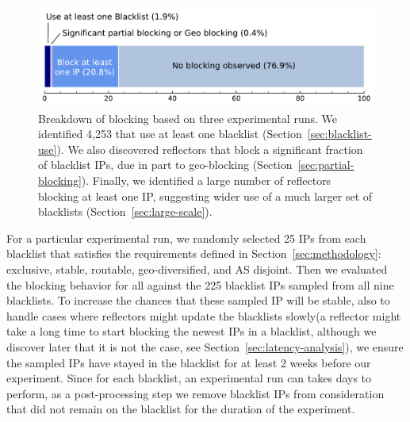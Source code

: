 \begin{figure}[t]
\centering
\includegraphics[width=0.95\columnwidth]{images/reflector_breakdown_v2.pdf}
\caption{Breakdown of {} blocking based on three
  experimental runs.  We identified 4,253 {} that use at
  least one blacklist (Section~\ref{sec:blacklist-use}).  We also
  discovered reflectors that block a significant fraction of blacklist
  IPs, due in part to geo-blocking
  (Section~\ref{sec:partial-blocking}).  Finally, we identified a
  large number of reflectors blocking at least one IP, suggesting
  wider use of a much larger set of blacklists
  (Section~\ref{sec:large-scale}).}
\label{fig:reflector-breakdown}
\end{figure}

For a particular experimental run, we randomly selected 25 IPs from
each blacklist that satisfies the requirements defined in
Section~\ref{sec:methodology}: exclusive, stable, routable,
geo-diversified, and AS disjoint. Then we evaluated the blocking
behavior for all {} {} against the 225
blacklist IPs sampled from all nine blacklists. To increase the chances
that these sampled IP will be stable, also to handle cases where reflectors
might update the blacklists slowly(a reflector might take a long time to
start blocking the newest IPs in a blacklist, although we discover
later that it is not the case, see Section~\ref{sec:latency-analysis}),
we ensure the sampled IPs have stayed in the blacklist for at least
2 weeks before our experiment. Since for each blacklist,
an experimental run can takes days to perform, as a post-processing step
we remove blacklist IPs from consideration that did not remain on the
blacklist for the duration of the experiment.



